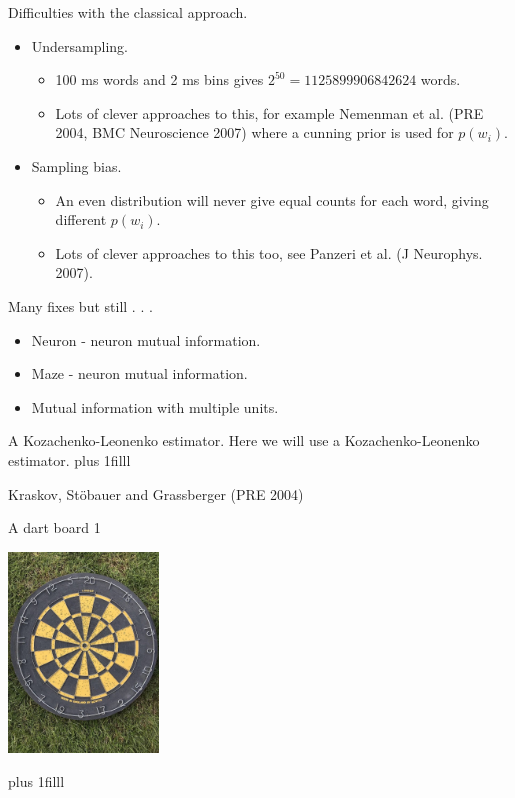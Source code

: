 \documentclass{beamer}
\newcommand{\btVFill}{\vskip0pt plus 1filll}
\begin{document}
\begin{frame}{Difficulties with the classical approach.}
\begin{itemize}
\item Undersampling. 
\begin{itemize}
\item 100 ms words and 2 ms bins gives $2^{50}=1125899906842624$ words.
\item Lots of clever approaches to this, for example Nemenman et al. (PRE 2004, BMC Neuroscience 2007) where a cunning prior is used for $p(w_i)$.
\end{itemize}
\item Sampling bias.
\begin{itemize}
\item An even distribution will never give equal counts for each word,
  giving different $p(w_i)$.
\item Lots of clever approaches to this too, see Panzeri et al. (J Neurophys. 2007).
\end{itemize}
\end{itemize}
\end{frame}

\begin{frame}{Many fixes but still . . . }
\begin{itemize}
\item Neuron - neuron mutual information.
\item Maze - neuron mutual information.
\item Mutual information with multiple units.
\end{itemize}
\end{frame}


\begin{frame}{A Kozachenko-Leonenko estimator.}
  Here we will use a Kozachenko-Leonenko estimator.
  \btVFill
  \begin{flushright}
    \color{gray}
    \tiny{Kraskov, St\"{o}bauer and Grassberger (PRE 2004)}
    \color{black}
\end{flushright}
\end{frame}


\begin{frame}{A dart board 1}
\color{reddish}
\begin{center}
\includegraphics[width=4cm]{dart_board.jpg}
\end{center}
\color{black}
\btVFill
\color{gray}
\color{black}
\end{frame}
\end{document}
